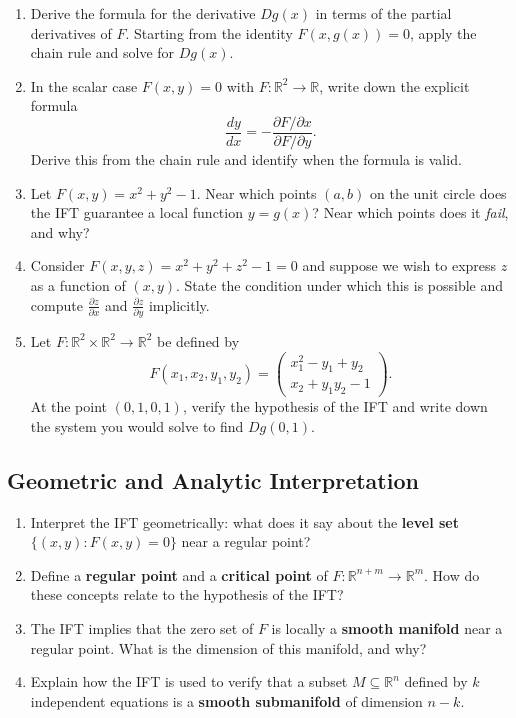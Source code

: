 \begin{enumerate}[resume]
  \item Derive the formula for the derivative $Dg(x)$ in terms of the partial derivatives of $F$. Starting from the identity $F(x, g(x)) = 0$, apply the chain rule and solve for $Dg(x)$.
  \item In the scalar case $F(x, y) = 0$ with $F : \mathbb{R}^2 \to \mathbb{R}$, write down the explicit formula
    \[
      \frac{dy}{dx} = -\frac{\partial F / \partial x}{\partial F / \partial y}.
    \]
    Derive this from the chain rule and identify when the formula is valid.
  \item Let $F(x, y) = x^2 + y^2 - 1$. Near which points $(a,b)$ on the unit circle does the IFT guarantee a local function $y = g(x)$? Near which points does it \emph{fail}, and why?
  \item Consider $F(x,y,z) = x^2 + y^2 + z^2 - 1 = 0$ and suppose we wish to express $z$ as a function of $(x,y)$. State the condition under which this is possible and compute $\frac{\partial z}{\partial x}$ and $\frac{\partial z}{\partial y}$ implicitly.
  \item Let $F : \mathbb{R}^2 \times \mathbb{R}^2 \to \mathbb{R}^2$ be defined by
    \[
      F(x_1, x_2, y_1, y_2) =
      \begin{pmatrix} x_1^2 - y_1 + y_2 \\ x_2 + y_1 y_2 - 1
      \end{pmatrix}.
    \]
    At the point $(0,1,0,1)$, verify the hypothesis of the IFT and write down the system you would solve to find $Dg(0,1)$.
\end{enumerate}

\subsection{Geometric and Analytic Interpretation}

\begin{enumerate}[resume]
  \item Interpret the IFT geometrically: what does it say about the \textbf{level set} $\{(x,y) : F(x,y) = 0\}$ near a regular point?
  \item Define a \textbf{regular point} and a \textbf{critical point} of $F : \mathbb{R}^{n+m} \to \mathbb{R}^m$. How do these concepts relate to the hypothesis of the IFT?
  \item The IFT implies that the zero set of $F$ is locally a \textbf{smooth manifold} near a regular point. What is the dimension of this manifold, and why?
  \item Explain how the IFT is used to verify that a subset $M \subseteq \mathbb{R}^n$ defined by $k$ independent equations is a \textbf{smooth submanifold} of dimension $n - k$.
\end{enumerate}

